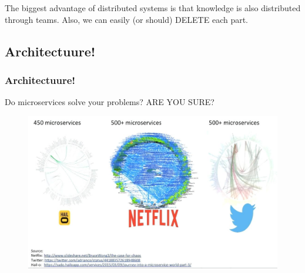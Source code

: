\begin{frame}
The biggest advantage of distributed systems is that knowledge is also distributed through teams. Also, we can easily (or should) DELETE each part.
\end{frame}
\subsection{Architectuure!}
\begin{frame}
\frametitle{Architectuure!}
Do microservices solve your problems? ARE YOU SURE?
\begin{figure}
	\centering
	\includegraphics[width=1\linewidth]{pictures/exampleOfMicroservices}
	\label{fig:microservicesexamples}
\end{figure}


\end{frame}

